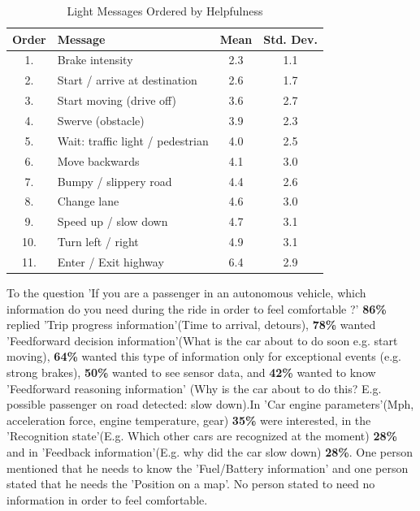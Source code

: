 \begin{table}
  \caption{Light Messages Ordered by Helpfulness}
  \label{tab:order}
  \begin{tabular}[t]{clcc}
    \toprule
    Order & Message & Mean & Std. Dev.\\
    \midrule
1.  & Brake intensity                     & 2.3 & 1.1 \\
2.  & Start / arrive  at destination       & 2.6 & 1.7 \\
3.  & Start moving (drive off)            & 3.6 & 2.7 \\
4.  & Swerve (obstacle)                   & 3.9 & 2.3 \\
5.  & Wait: traffic light / pedestrian & 4.0 & 2.5 \\
6.  & Move backwards                      & 4.1 & 3.0 \\
7.  & Bumpy  / slippery road               & 4.4 & 2.6 \\
8.  & Change lane                         & 4.6 & 3.0 \\
9.  & Speed up / slow down                & 4.7 & 3.1 \\
10. & Turn left / right                   & 4.9 & 3.1 \\
11. & Enter / Exit highway                & 6.4 & 2.9
\end{tabular}
\end{table}

To the question 'If you are a passenger in an autonomous vehicle, which information do you need during the ride in order to feel comfortable ?' 
\textbf{86\%} replied 'Trip progress information'(Time to arrival, detours), \textbf{78\%} wanted 'Feedforward decision information'(What is the car about to do soon e.g. start moving), \textbf{64\%} wanted this type of information only for exceptional events (e.g. strong brakes), \textbf{50\%} wanted to see sensor data, and \textbf{42\%} wanted to know 'Feedforward reasoning information' (Why is the car about to do this? E.g. possible passenger on road detected: slow down).In 'Car engine parameters'(Mph, acceleration force, engine temperature, gear) \textbf{35\%} were interested, in the 'Recognition state'(E.g. Which other cars are recognized at the moment) \textbf{28\%} and in 'Feedback information'(E.g. why did the car slow down) \textbf{28\%}. One person mentioned that he needs to know the 'Fuel/Battery information' and one person stated that he needs the 'Position on a map'. No person stated to need no information in order to feel comfortable. 

